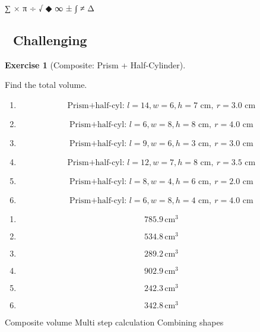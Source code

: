 \documentclass[
  letterpaper,
  DIV=11,
  numbers=noendperiod]{scrreprt}
\theoremstyle{definition}
\newtheorem{exercise}{Exercise}[chapter]
\theoremstyle{remark}
\begin{document}
∑ × π ÷ √ ◆ ∞ ± ∫ ≠ Δ

\subsection{🔴 Challenging}

\begin{exercise}[Composite: Prism +
Half-Cylinder]\protect\hypertarget{exr-comp-1}{}\label{exr-comp-1}

Find the total volume.

\begin{enumerate}
\def\labelenumi{\alph{enumi})}
\item
  \[\text{Prism+half-cyl: }l=14,w=6,h=7\text{ cm},\ r=3.0\text{ cm}\]
\item
  \[\text{Prism+half-cyl: }l=6,w=8,h=8\text{ cm},\ r=4.0\text{ cm}\]
\item
  \[\text{Prism+half-cyl: }l=9,w=6,h=3\text{ cm},\ r=3.0\text{ cm}\]
\item
  \[\text{Prism+half-cyl: }l=12,w=7,h=8\text{ cm},\ r=3.5\text{ cm}\]
\item
  \[\text{Prism+half-cyl: }l=8,w=4,h=6\text{ cm},\ r=2.0\text{ cm}\]
\item
  \[\text{Prism+half-cyl: }l=6,w=8,h=4\text{ cm},\ r=4.0\text{ cm}\]
\end{enumerate}

\begin{tcolorbox}[enhanced jigsaw, opacitybacktitle=0.6, coltitle=black, arc=.35mm, colframe=quarto-callout-tip-color-frame, colback=white, bottomrule=.15mm, left=2mm, colbacktitle=quarto-callout-tip-color!10!white, titlerule=0mm, opacityback=0, title=\textcolor{quarto-callout-tip-color}{\faLightbulb}\hspace{0.5em}{🔍 View Solution}, leftrule=.75mm, breakable, rightrule=.15mm, bottomtitle=1mm, toptitle=1mm, toprule=.15mm]

\begin{enumerate}
\def\labelenumi{\alph{enumi})}
\item
  \[785.9\,\text{cm}^{3}\]
\item
  \[534.8\,\text{cm}^{3}\]
\item
  \[289.2\,\text{cm}^{3}\]
\item
  \[902.9\,\text{cm}^{3}\]
\item
  \[242.3\,\text{cm}^{3}\]
\item
  \[342.8\,\text{cm}^{3}\]
\end{enumerate}

\end{tcolorbox}

{Composite volume} {Multi step calculation} {Combining shapes}

\end{exercise}
\end{document}
